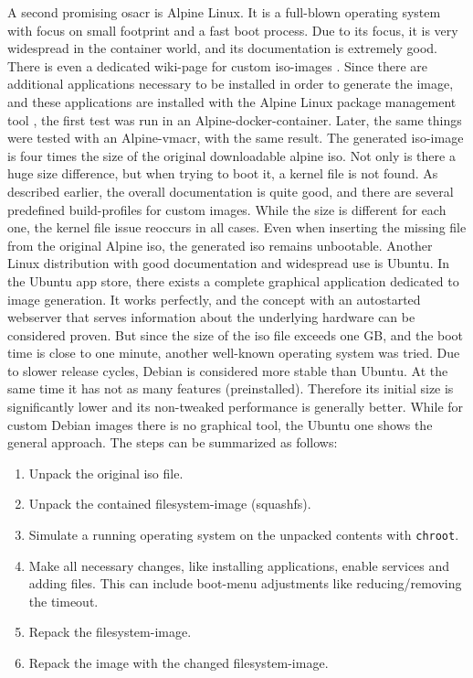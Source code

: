 \newline
A second promising \gls{osacr} is Alpine Linux. It is a full-blown operating system with focus on small footprint and a fast boot process. Due to its focus, it is very widespread in the container world, and its documentation is extremely good. There is even a dedicated wiki-page for custom iso-images \cite{alpine_custom_iso}. Since there are additional applications necessary to be installed in order to generate the image, and these applications are installed with the Alpine Linux package management tool , the first test was run in an Alpine-docker-container. Later, the same things were tested with an Alpine-\gls{vmacr}, with the same result. The generated iso-image is four times the size of the original downloadable alpine iso. Not only is there a huge size difference, but when trying to boot it, a kernel file is not found. As described earlier, the overall documentation is quite good, and there are several predefined build-profiles for custom images. While the size is different for each one, the kernel file issue reoccurs in all cases. Even when inserting the missing file from the original Alpine iso, the generated iso remains unbootable.
\newline
Another Linux distribution with good documentation and widespread use is Ubuntu. In the Ubuntu app store, there exists a complete graphical application dedicated to image generation. It works perfectly, and the concept with an autostarted webserver that serves information about the underlying hardware can be considered proven. But since the size of the iso file exceeds one GB, and the boot time is close to one minute, another well-known operating system was tried.
\newline
Due to slower release cycles, Debian is considered more stable than Ubuntu. At the same time it has not as many features (preinstalled). Therefore its initial size is significantly lower and its non-tweaked performance is generally better. While for custom Debian images there is no graphical tool, the Ubuntu one shows the general approach. The steps can be summarized as follows:

\begin{enumerate}
  \item Unpack the original iso file.
  \item Unpack the contained filesystem-image (squashfs).
  \item Simulate a running operating system on the unpacked contents with \texttt{chroot}.
  \item Make all necessary changes, like installing applications, enable services and adding files. This can include boot-menu adjustments like reducing/removing the timeout.
  \item Repack the filesystem-image.
  \item Repack the image with the changed filesystem-image.
\end{enumerate}

